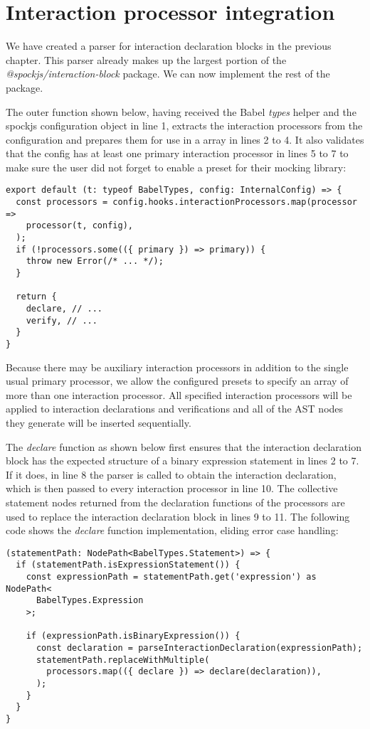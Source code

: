 \section{Interaction processor integration}
We have created a parser for
interaction declaration blocks
in the previous chapter.
This parser already makes up the largest portion of the
\textit{@spockjs/interaction-block} package.
We can now implement the rest of the package.

The outer function shown below,
having received the Babel \textit{types} helper
and the spockjs configuration object in line 1,
extracts the interaction processors from the configuration
and prepares them for use in a  array in lines 2 to 4.
It also validates that the config has at least one
primary interaction processor in lines 5 to 7
to make sure the user did not forget
to enable a preset for their mocking library:
\begin{verbatim}
export default (t: typeof BabelTypes, config: InternalConfig) => {
  const processors = config.hooks.interactionProcessors.map(processor =>
    processor(t, config),
  );
  if (!processors.some(({ primary }) => primary)) {
    throw new Error(/* ... */);
  }

  return {
    declare, // ...
    verify, // ...
  }
}
\end{verbatim}

Because there may be auxiliary interaction processors
in addition to the single usual primary processor,
we allow the configured presets to specify an array
of more than one interaction processor.
All specified interaction processors
will be applied to interaction declarations and verifications
and all of the AST nodes they generate will be inserted sequentially.

The \textit{declare} function as shown below
first ensures that the interaction declaration block
has the expected structure of a binary expression statement
in lines 2 to 7.
If it does, in line 8 the parser is called
to obtain the interaction declaration,
which is then passed to every
interaction processor in line 10.
The collective statement nodes returned from
the declaration functions of the processors
are used to replace the interaction declaration block
in lines 9 to 11.
The following code shows the \textit{declare} function implementation,
eliding error case handling:
\begin{verbatim}
(statementPath: NodePath<BabelTypes.Statement>) => {
  if (statementPath.isExpressionStatement()) {
    const expressionPath = statementPath.get('expression') as NodePath<
      BabelTypes.Expression
    >;

    if (expressionPath.isBinaryExpression()) {
      const declaration = parseInteractionDeclaration(expressionPath);
      statementPath.replaceWithMultiple(
        processors.map(({ declare }) => declare(declaration)),
      );
    }
  }
}
\end{verbatim}

